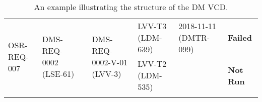\begin{longtable}[]{|p{1.5cm}|p{2.7cm}|p{1.5cm}|p{3.2cm}|p{1.5cm}|p{1.7cm}|p{1.5cm}|}
\multirow{2}{*}{
\tiny OSR-REQ-007} &
\multirow{2}{*}{
\begin{minipage}[t]{0.9\columnwidth}
{\small DMS-REQ-0002}\newline
{\scriptsize (LSE-61)}
\end{minipage}} &
\multirow{2}{*}{} &
\multirow{2}{*}{
\begin{minipage}[t]{0.9\columnwidth}
{\small DMS-REQ-0002-V-01}\newline
{\scriptsize (LVV-3)}
\end{minipage}} &
\begin{minipage}[t]{0.9\columnwidth}
{\small LVV-T3}\newline
{\scriptsize (LDM-639)}
\end{minipage} &
\begin{minipage}[t]{0.9\columnwidth}
{\small 2018-11-11}\newline
{\scriptsize (DMTR-099)}
\end{minipage} &
{\small \bf Failed} \\ \cline{5-7}
 & & & &
\begin{minipage}[t]{0.9\columnwidth}
{\small LVV-T2}\newline
{\scriptsize (LDM-535)}
\end{minipage} &
 &
{\small \bf Not Run}
\\\hline

\caption{An example illustrating the structure of the DM VCD.}
\label{tab:dmvcd}
\end{longtable}
